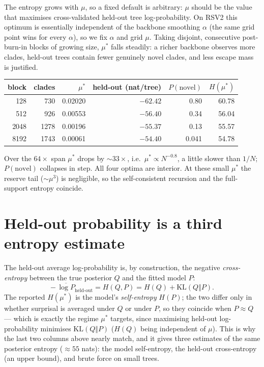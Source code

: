 \documentclass{article}
\newcommand{\KL}{\mathrm{KL}}
\begin{document}
The entropy grows with $\mu$, so a fixed default is arbitrary: $\mu$ should be the
value that maximises cross-validated held-out tree log-probability. On RSV2 this
optimum is essentially independent of the backbone smoothing $\alpha$ (the same
grid point wins for every $\alpha$), so we fix $\alpha$ and grid $\mu$. Taking
disjoint, consecutive post-burn-in blocks of growing size, $\mu^{*}$ falls
steadily: a richer backbone observes more clades, held-out trees contain fewer
genuinely novel clades, and less escape mass is justified.

\begin{center}
\begin{tabular}{rrrrrr}
\hline
block & clades & $\mu^{*}$ & held-out (nat/tree) & $P(\text{novel})$ & $H(\mu^{*})$\\
\hline
128   & 730  & 0.02020 & $-62.42$ & 0.80  & 60.78\\
512   & 926  & 0.00553 & $-56.40$ & 0.34  & 56.04\\
2048  & 1278 & 0.00196 & $-55.37$ & 0.13  & 55.57\\
8192  & 1743 & 0.00061 & $-54.40$ & 0.041 & 54.78\\
\hline
\end{tabular}
\end{center}

\noindent
Over the $64\times$ span $\mu^{*}$ drops by $\sim33\times$, i.e.\
$\mu^{*}\propto N^{-0.8}$, a little slower than $1/N$; $P(\text{novel})$ collapses
in step. All four optima are interior. At these small $\mu^{*}$ the reserve tail
($\sim\mu^{3}$) is negligible, so the self-consistent recursion and the
full-support entropy coincide.

\section*{Held-out probability is a third entropy estimate}

The held-out average log-probability is, by construction, the negative
\emph{cross-entropy} between the true posterior $Q$ and the fitted model $P$:
\begin{equation}
  -\,\overline{\log P}_{\text{held-out}} = H(Q,P) = H(Q) + \KL(Q\Vert P).
\end{equation}
The reported $H(\mu^{*})$ is the model's \emph{self-entropy} $H(P)$; the two
differ only in whether surprisal is averaged under $Q$ or under $P$, so they
coincide when $P\approx Q$ --- which is exactly the regime $\mu^{*}$ targets, since
maximising held-out log-probability minimises $\KL(Q\Vert P)$ ($H(Q)$ being
independent of $\mu$). This is why the last two columns above nearly match, and it
gives three estimates of the same posterior entropy ($\approx 55$ nats):
the model self-entropy, the held-out cross-entropy (an upper bound), and brute
force on small trees.
\end{document}
